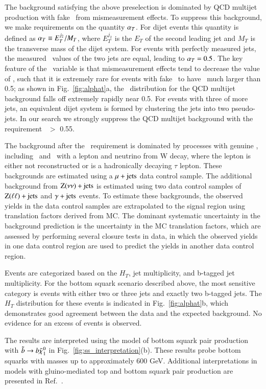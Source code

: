 The background satisfying the above preselection is dominated by QCD multijet production with fake \met\ from mismeasurement effects. To suppress this background,
we make requirements on the quantity $\alpha_{T}$. For dijet events this quantity is defined as $\alpha_{T} \equiv E_{T}^{j_2} / M_{T}$, where $E_{T}^{j_2}$ is the $E_T$
of the second leading jet and $M_T$ is the transverse mass of the dijet system. 
For events with perfectly measured jets, the measured \pt\ values of the two jets are equal, leading to $\alpha_{T}=0.5$. The key feature of the \alphat\ variable
is that mismeasurement effects tend to decrease the value of \alphat, such that it is extremely rare for events with fake \met\ to have \alphat\
much larger than 0.5; as shown in Fig.~\ref{fig:alphat}a, the \alphat\ distribution for the QCD multijet background falls off extremely rapidly near 0.5.
For events with three of more jets, an equivalent dijet system is formed by  clustering the jets into two pseudo-jets. In our search we strongly suppress the
QCD multijet background with the requirement \alphat\ $>$ 0.55.

The background after the \alphat\ requirement is dominated by processes with genuine \met, including \ttljets\ and \wjets\ with a lepton and neutrino from W decay,
where the lepton is either not reconstructed or is a hadronically decaying $\tau$ lepton. 
These backgrounds are estimated using a $\mu+\rm{jets}$ data control sample.
The additional background from $\rm{Z}(\nu\nu)+\rm{jets}$ is estimated using two data control samples of $\rm{Z}(\ell\ell)+\rm{jets}$ and  $\gamma+\rm{jets}$ events. To estimate these backgrounds, the observed yields in the data control samples are extrapolated to the
signal region using translation factors derived from MC. The dominant systematic uncertainty in the background prediction is the uncertainty
in the MC translation factors, which are assessed by performing several closure tests in data, in which the observed yields in one data control region
are used to predict the yields in another data control region.

Events are categorized based on the $H_T$, jet multiplicity, and b-tagged jet multiplicity. For the bottom squark scenario described above, the most sensitive
category is events with either two or three jets and exactly two b-tagged jets. The $H_T$ distribution for these events is indicated in Fig.~\ref{fig:alphat}b,
which demonstrates good agreement between the data and the expected background. No evidence for an excess of events is observed.

The results are interpreted  using the model of bottom squark pair production with $\tilde{b}\to b\tilde{\chi}_{1}^{0}$ in Fig.~\ref{fig:ss_interpretation}(b).
These results probe bottom squarks with masses up to approximately 600 GeV. Additional interpretations in models with gluino-mediated
top and bottom squark pair production are presented in Ref.~\cite{ref:alphat}.


